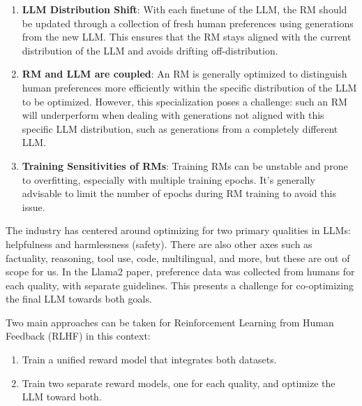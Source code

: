 \documentclass[
  letterpaper,
  numbers=noenddot,
  DIV=11,
  oneside]{scrreprt}
\theoremstyle{remark}
\begin{document}
\begin{enumerate}
\def\labelenumi{\arabic{enumi}.}
\item
  \textbf{LLM Distribution Shift}: With each finetune of the LLM, the RM
  should be updated through a collection of fresh human preferences
  using generations from the new LLM. This ensures that the RM stays
  aligned with the current distribution of the LLM and avoids drifting
  off-distribution.
\item
  \textbf{RM and LLM are coupled}: An RM is generally optimized to
  distinguish human preferences more efficiently within the specific
  distribution of the LLM to be optimized. However, this specialization
  poses a challenge: such an RM will underperform when dealing with
  generations not aligned with this specific LLM distribution, such as
  generations from a completely different LLM.
\item
  \textbf{Training Sensitivities of RMs}: Training RMs can be unstable
  and prone to overfitting, especially with multiple training epochs.
  It's generally advisable to limit the number of epochs during RM
  training to avoid this issue.
\end{enumerate}

The industry has centered around optimizing for two primary qualities in
LLMs: helpfulness and harmlessness (safety). There are also other axes
such as factuality, reasoning, tool use, code, multilingual, and more,
but these are out of scope for us. In the Llama2 paper, preference data
was collected from humans for each quality, with separate guidelines.
This presents a challenge for co-optimizing the final LLM towards both
goals.

Two main approaches can be taken for Reinforcement Learning from Human
Feedback (RLHF) in this context:

\begin{enumerate}
\def\labelenumi{\arabic{enumi}.}
\item
  Train a unified reward model that integrates both datasets.
\item
  Train two separate reward models, one for each quality, and optimize
  the LLM toward both.
\end{enumerate}
\end{document}
